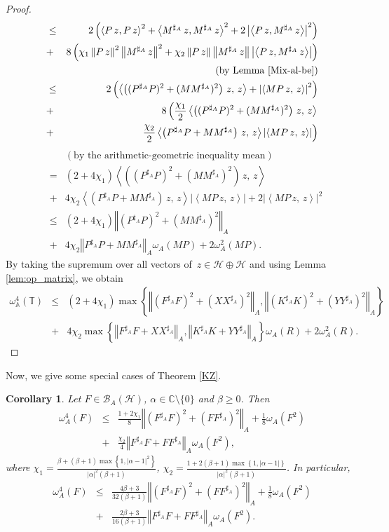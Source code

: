 \documentclass{article}
\newcommand{\bra}[1]{\left(#1\right)}
\newcommand{\seq}[1]{\left<#1\right>}
\newcommand{\norm}[1]{\left\Vert#1\right\Vert}
\newcommand{\normA}[1]{{\left\Vert#1\right\Vert}_{A}}
\newcommand{\abs}[1]{\left\vert#1\right\vert}
\newcommand{\set}[1]{\left\{#1\right\}}
\renewcommand{\c}{\mathbb C}
\newcommand{\hh}{\mathcal{H}\oplus\mathcal{H}}
\newcommand {\A}{\mathbb{A}}
\newcommand {\Ma}{M^{\sharp_{A}}}
\newcommand {\T}{\mathbb{T}}
\newcommand {\h}{\mathcal{H}}
\newcommand {\Xa}{X^{\sharp_{A}}}
\renewcommand {\b}{\mathcal{B}}
\newcommand {\Ya}{Y^{\sharp_{A}}}
\newcommand {\Ka}{K^{\sharp_{A}}}
\newcommand {\Fa}{F^{\sharp_{A}}}
\newcommand {\Pa}{P^{\sharp_{A}}}
\newtheorem{corollary}[theorem]{Corollary}
\begin{document}
\begin{proof}
\begin{eqnarray*}
   &\leq& 2\bra{\seq{P\,z,P\,z}^2+\seq{\Ma\,z,\Ma\,z}^2+2\abs{\seq{P\,z,\Ma\,z}}^2}\\
   &+&8\bra{\chi_1\norm{P\,z}^2\norm{\Ma\,z}^2
   +\chi_2\norm{P\,z}\norm{\Ma\,z}\abs{\seq{P\,z,\Ma\,z}}}\\
   &&\bra{\mbox{by Lemma \ref{Mix-al-be}}}\\
   &\leq&2\bra{\seq{\bra{(\Pa P)^2+(M\Ma)^2}\,z,\,z}+\abs{\seq{MP\,z,\,z}}^2}\\
   &+& 8\left(\frac{\chi_1}{2}\seq{\bra{(\Pa P)^2+(M\Ma)^2}\,z,\,z}\right.\\
   &+&\left.\frac{\chi_2}{2}\seq{\bra{\Pa P+M\Ma}\,z,\,z}\abs{\seq{MP\,z,\,z}}\right)
   \end{eqnarray*}
   \begin{eqnarray*}
   &&\bra{\mbox{by the arithmetic-geometric inequality  mean}}\\
   &=& \bra{2+4\chi_1}\seq{\bra{(\Pa P)^2+(M\Ma)^2}\,z,\,z}\\
   &+&4\chi_2\seq{\bra{\Pa P+M\Ma}\,z,\,z}\abs{\seq{MP\,z,\,z}}+2\abs{\seq{MP\,z,\,z}}^2\\
   &\leq&\bra{2+4\chi_1}\normA{(\Pa P)^2+(M\Ma)^2}\\
   &+&4\chi_2\normA{\Pa P+M\Ma}\omega_A(MP)+2\omega_A^2(MP).
\end{eqnarray*}
By taking the supremum over all vectors of $\,z\in\hh$ and using Lemma \ref{lem:op_matrix}, we obtain
\begin{eqnarray*}
  \omega_{\A}^4(\T) &\leq& \bra{2+4\chi_1}\max\set{\normA{(\Fa F)^2+(X\Xa)^2},\normA{(\Ka K)^2+(Y\Ya)^2}}\\
   &+&4\chi_2\max\set{\normA{\Fa F+X\Xa},\normA{\Ka K+Y\Ya}}\omega_A(R)+2\omega_A^2(R).
\end{eqnarray*}
\end{proof}
Now, we give some special cases of Theorem \ref{KZ}.
\begin{corollary}\label{Cor:college1} Let $F\in\b_A(\h)$, $\alpha\in\c\setminus\{0\}$ and $\beta\geq 0$. Then
  \begin{eqnarray}\label{Ineq:KZ1}
    \omega_A^{4}(F) &\leq& \frac{1+2\chi_1}{8}\normA{(\Fa F)^2+(F\Fa)^2}+\frac{1}{8}\omega_A(F^2)\nonumber\\
    &+&\frac{\chi_2}{4}\normA{\Fa F+F\Fa}\omega_A(F^2),
\end{eqnarray}
 where $\chi_1=\frac{\beta+(\beta+1)\max\set{1,\abs{\alpha-1}^2}}{\abs{\alpha}^2(\beta+1)}$,
$\chi_2=\frac{1+2(\beta+1)\max\set{1,\abs{\alpha-1}}}{\abs{\alpha}^2(\beta+1)}$. In particular,
\begin{eqnarray}\label{Ineq:KZ2}
    \omega_A^{4}(F) &\leq&  \frac{4\beta+3}{32(\beta+1)}\normA{(\Fa F)^2+(F\Fa)^2}+\frac{1}{8}\omega_A(F^2)\nonumber\\
    &+&\frac{2\beta+3}{16(\beta+1)}\normA{\Fa F+F\Fa}\omega_A(F^2).
\end{eqnarray}
\end{corollary}
\end{document}
